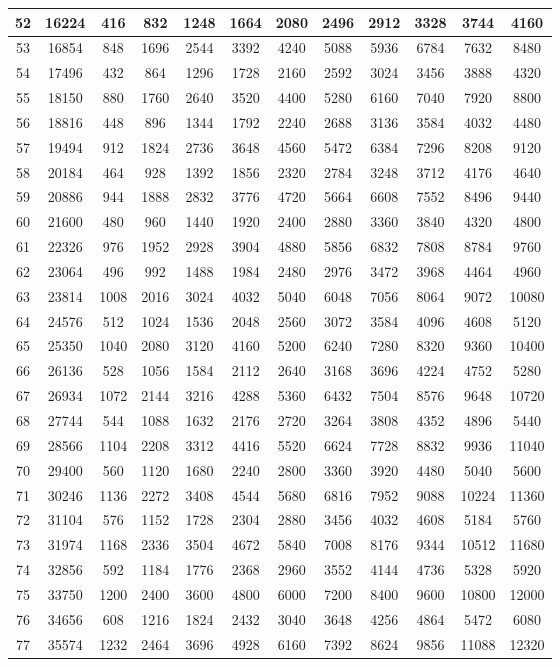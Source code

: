 \documentclass[oneside,english]{book}
\providecommand{\tabularnewline}{\\}
\begin{document}
\begin{center}
\begin{longtable}{|c|c|c|c|c|c|c|c|c|c|c|c|}
\hline
52 & 16224 & 416 & 832 & 1248 & 1664 & 2080 & 2496 & 2912 & 3328 & 3744 & 4160\tabularnewline
\hline
53 & 16854 & 848 & 1696 & 2544 & 3392 & 4240 & 5088 & 5936 & 6784 & 7632 & 8480\tabularnewline
\hline
54 & 17496 & 432 & 864 & 1296 & 1728 & 2160 & 2592 & 3024 & 3456 & 3888 & 4320\tabularnewline
\hline
55 & 18150 & 880 & 1760 & 2640 & 3520 & 4400 & 5280 & 6160 & 7040 & 7920 & 8800\tabularnewline
\hline
56 & 18816 & 448 & 896 & 1344 & 1792 & 2240 & 2688 & 3136 & 3584 & 4032 & 4480\tabularnewline
\hline
57 & 19494 & 912 & 1824 & 2736 & 3648 & 4560 & 5472 & 6384 & 7296 & 8208 & 9120\tabularnewline
\hline
58 & 20184 & 464 & 928 & 1392 & 1856 & 2320 & 2784 & 3248 & 3712 & 4176 & 4640\tabularnewline
\hline
59 & 20886 & 944 & 1888 & 2832 & 3776 & 4720 & 5664 & 6608 & 7552 & 8496 & 9440\tabularnewline
\hline
60 & 21600 & 480 & 960 & 1440 & 1920 & 2400 & 2880 & 3360 & 3840 & 4320 & 4800\tabularnewline
\hline
61 & 22326 & 976 & 1952 & 2928 & 3904 & 4880 & 5856 & 6832 & 7808 & 8784 & 9760\tabularnewline
\hline
62 & 23064 & 496 & 992 & 1488 & 1984 & 2480 & 2976 & 3472 & 3968 & 4464 & 4960\tabularnewline
\hline
63 & 23814 & 1008 & 2016 & 3024 & 4032 & 5040 & 6048 & 7056 & 8064 & 9072 & 10080\tabularnewline
\hline
64 & 24576 & 512 & 1024 & 1536 & 2048 & 2560 & 3072 & 3584 & 4096 & 4608 & 5120\tabularnewline
\hline
65 & 25350 & 1040 & 2080 & 3120 & 4160 & 5200 & 6240 & 7280 & 8320 & 9360 & 10400\tabularnewline
\hline
66 & 26136 & 528 & 1056 & 1584 & 2112 & 2640 & 3168 & 3696 & 4224 & 4752 & 5280\tabularnewline
\hline
67 & 26934 & 1072 & 2144 & 3216 & 4288 & 5360 & 6432 & 7504 & 8576 & 9648 & 10720\tabularnewline
\hline
68 & 27744 & 544 & 1088 & 1632 & 2176 & 2720 & 3264 & 3808 & 4352 & 4896 & 5440\tabularnewline
\hline
69 & 28566 & 1104 & 2208 & 3312 & 4416 & 5520 & 6624 & 7728 & 8832 & 9936 & 11040\tabularnewline
\hline
70 & 29400 & 560 & 1120 & 1680 & 2240 & 2800 & 3360 & 3920 & 4480 & 5040 & 5600\tabularnewline
\hline
71 & 30246 & 1136 & 2272 & 3408 & 4544 & 5680 & 6816 & 7952 & 9088 & 10224 & 11360\tabularnewline
\hline
72 & 31104 & 576 & 1152 & 1728 & 2304 & 2880 & 3456 & 4032 & 4608 & 5184 & 5760\tabularnewline
\hline
73 & 31974 & 1168 & 2336 & 3504 & 4672 & 5840 & 7008 & 8176 & 9344 & 10512 & 11680\tabularnewline
\hline
74 & 32856 & 592 & 1184 & 1776 & 2368 & 2960 & 3552 & 4144 & 4736 & 5328 & 5920\tabularnewline
\hline
75 & 33750 & 1200 & 2400 & 3600 & 4800 & 6000 & 7200 & 8400 & 9600 & 10800 & 12000\tabularnewline
\hline
76 & 34656 & 608 & 1216 & 1824 & 2432 & 3040 & 3648 & 4256 & 4864 & 5472 & 6080\tabularnewline
\hline
77 & 35574 & 1232 & 2464 & 3696 & 4928 & 6160 & 7392 & 8624 & 9856 & 11088 & 12320\tabularnewline

\end{longtable}
\end{center}
\end{document}

